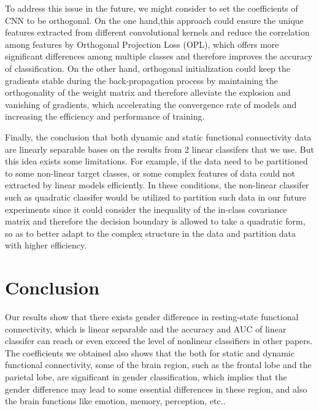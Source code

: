 \documentclass[11pt]{article}
\begin{document}
To address this issue in the future, we might consider to set the coefficients of CNN to be orthogonal. On the one hand,this approach could ensure the unique features extracted from different convolutional kernels and reduce the correlation among features by Orthogonal Projection Loss (OPL)\cite{ranasinghe2021orthogonal}, which offers more significant differences among multiple classes and therefore improves the accuracy of classification. On the other hand, orthogonal initialization could keep the gradients stable during the back-propagation process by maintaining the orthogonality of the weight matrix and therefore alleviate the explosion and vanishing of gradients\cite{Achour2021-rl}, which accelerating the convergence rate of models and increasing the efficiency and performance of training.

Finally, the conclusion that both dynamic and static functional connectivity data are linearly separable bases on the results from 2 linear classifers that we use. But this idea exists some limitations. For example, if the data need to be partitioned to some non-linear target classes, or some complex features of data could not extracted by linear models efficiently. In these conditions, the non-linear classifer such as quadratic classifer would be utilized to partition such data in our future experiments since it could consider the inequality of the in-class covariance matrix and therefore the decision boundary is allowed to take a quadratic form\cite{Rasero2018-hi}, so as to better adapt to the complex structure in the data and partition data with higher efficiency.

\section{Conclusion}

Our results show that there exists gender difference in resting-state functional connectivity, which is linear separable and the accuracy and AUC of linear classifer can reach or even exceed the level of nonlinear classifiers in other papers. The coefficients we obtained also shows that the both for static and dynamic functional connectivity, some of the brain region, such as the frontal lobe and the parietal lobe, are significant in gender classification, which implies that the gender difference may lead to some essential differences in these region, and also the brain functions like emotion, memory, perception, etc..

\newpage
\end{document}
